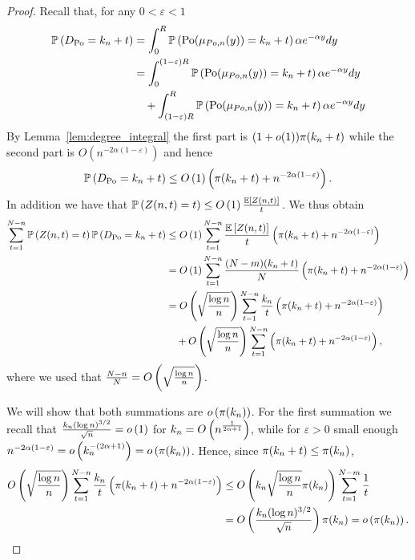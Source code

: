 \begin{proof}
Recall that, for any $0 < \varepsilon < 1$
\begin{align*}
	\mathbb{P}\left(D_{{\mathrm{Po}}} = k_n + t\right) &= \int_0^R \mathbb{P}\left({\mathrm{Po}}(\mu_{Po,n}(y)) = k_n+ t\right) \alpha e^{-\alpha y} dy\\
	&= \int_0^{(1-\varepsilon)R} \mathbb{P}\left({\mathrm{Po}}(\mu_{Po,n}(y)) = k_n+ t\right) \alpha e^{-\alpha y} dy \\
	&\hspace{10pt}+ \int_{(1-\varepsilon)R}^R \mathbb{P}\left({\mathrm{Po}}(\mu_{Po,n}(y)) = k_n+ t\right) \alpha e^{-\alpha y} dy
\end{align*}
By Lemma~\ref{lem:degree_integral} the first part is $(1+o(1)) {\pi}(k_n + t)$ while the second part is $O(n^{-2\alpha(1-\varepsilon)})$ and hence
\[
	\mathbb{P}\left(D_{{\mathrm{Po}}} = k_n + t\right) \le O\left(1\right)\left({\pi}(k_n + t) + n^{-2\alpha(1-\varepsilon)}\right).
\]
In addition we have that $\mathbb{P}\left(Z(n,t) = t\right) \le O\left(1\right) \frac{\mathbb{E}\left[Z(n,t)\right]}{t}$. We thus obtain
\begin{align*}
	\sum_{t = 1}^{N-n} \mathbb{P}\left(Z(n,t) = t\right)\mathbb{P}\left(D_{{\mathrm{Po}}} = k_n + t\right)
	&\le O\left(1\right) \sum_{t = 1}^{N-n} \frac{\mathbb{E}\left[Z(n,t)\right]}{t}\left({\pi}(k_n + t) + n^{-2\alpha(1-\varepsilon)}\right)\\
	&= O\left(1\right) \sum_{t = 1}^{N-n} \frac{(N-m)(k_n + t)}{N}\left({\pi}(k_n + t) + n^{-2\alpha(1-\varepsilon)}\right)\\
	&= O\left(\sqrt{\frac{\log n}{n}}\right) \sum_{t = 1}^{N-n} \frac{k_n}{t}
		\left({\pi}(k_n + t) + n^{-2\alpha(1-\varepsilon)}\right)\\
	&\hspace{10pt}+ O\left(\sqrt{\frac{\log n}{n}}\right) \sum_{t = 1}^{N-n}
		\left({\pi}(k_n + t) + n^{-2\alpha(1-\varepsilon)}\right),
\end{align*}
where we used that $\frac{N-n}{N} = O\left(\sqrt{\frac{\log n}{n}}\right)$.

We will show that both summations are $o\left({\pi}(k_n)\right)$. For the first summation we recall that $\frac{k_n (\log n)^{3/2}}{\sqrt{n}} = o\left(1\right)$ for $k_n = O\left(n^{\frac{1}{2\alpha + 1}}\right)$, while for $\varepsilon > 0$ small enough $n^{-2\alpha(1-\varepsilon)} = o\left(k_n^{-(2\alpha + 1)}\right) = o\left({\pi}(k_n)\right)$. Hence, since ${\pi}(k_n + t)\le {\pi}(k_n)$,
\begin{align*}
	O\left(\sqrt{\frac{\log n}{n}}\right) \sum_{t = 1}^{N-n} \frac{k_n}{t}
		\left({\pi}(k_n + t) + n^{-2\alpha(1-\varepsilon)}\right)
	&\le O\left( k_n \sqrt{\frac{\log n}{n}} {\pi}(k_n)\right) \sum_{t = 1}^{N - m} \frac{1}{t}\\
	&= O\left(\frac{k_n (\log n)^{3/2}}{\sqrt{n}}\right) {\pi}(k_n) = o\left({\pi}(k_n)\right).
\end{align*}


\end{proof}
